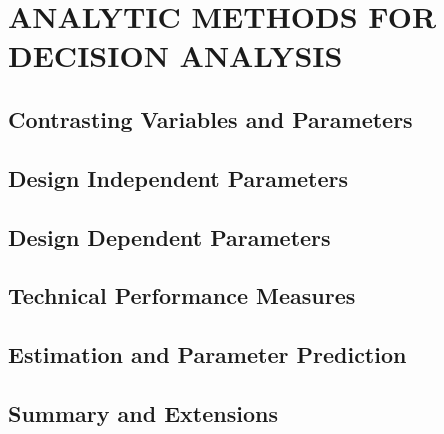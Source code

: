 \chapter{ANALYTIC METHODS FOR DECISION ANALYSIS}\label{chap:9}

\section{Contrasting Variables and Parameters}


\section{Design Independent Parameters}


\section{Design Dependent Parameters}


\section{Technical Performance Measures}


\section{Estimation and Parameter Prediction}


\section{Summary and Extensions}


\begin{exercises}
    \begin{exercise}
    \label{sea-9-1}
    
    \end{exercise}
    \begin{solution}
    \end{solution}

\end{exercises}
